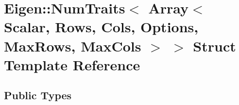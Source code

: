 \hypertarget{struct_eigen_1_1_num_traits_3_01_array_3_01_scalar_00_01_rows_00_01_cols_00_01_options_00_01_max_rows_00_01_max_cols_01_4_01_4}{}\section{Eigen\+::Num\+Traits$<$ Array$<$ Scalar, Rows, Cols, Options, Max\+Rows, Max\+Cols $>$ $>$ Struct Template Reference}
\label{struct_eigen_1_1_num_traits_3_01_array_3_01_scalar_00_01_rows_00_01_cols_00_01_options_00_01_max_rows_00_01_max_cols_01_4_01_4}
\subsection*{Public Types}
